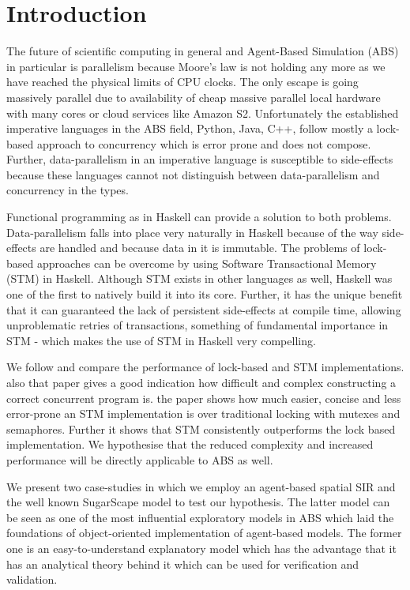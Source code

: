 \section{Introduction} %
The future of scientific computing in general and Agent-Based Simulation (ABS) in particular is parallelism because Moore's law is not holding any more as we have reached the physical limits of CPU clocks. The only escape is going massively parallel due to availability of cheap massive parallel local hardware with many cores or cloud services like Amazon S2. Unfortunately the established imperative languages in the ABS field, Python, Java, C++, follow mostly a lock-based approach to concurrency which is error prone and does not compose. Further, data-parallelism in an imperative language is susceptible to side-effects because these languages cannot not distinguish between data-parallelism and concurrency in the types. 

Functional programming as in Haskell can provide a solution to both problems. Data-parallelism falls into place very naturally in Haskell because of the way side-effects are handled and because data in it is immutable. The problems of lock-based approaches can be overcome by using Software Transactional Memory (STM) in Haskell. Although STM exists in other languages as well, Haskell was one of the first to natively build it into its core. Further, it has the unique benefit that it can guaranteed the lack of persistent side-effects at compile time, allowing unproblematic retries of transactions, something of fundamental importance in STM - which makes the use of STM in Haskell very compelling.

We follow \cite{discolo_lock_2006} and compare the performance of lock-based and STM implementations.  also that paper gives a good indication how difficult and complex constructing a correct concurrent program is. the paper shows how much easier, concise and less error-prone an STM implementation is over traditional locking with mutexes and semaphores. Further it shows that STM consistently outperforms the lock based implementation. We hypothesise that the reduced complexity and increased performance will be directly applicable to ABS as well.

We present two case-studies in which we employ an agent-based spatial SIR \citep{macal_agent-based_2010} and the well known SugarScape \citep{epstein_growing_1996} model to test our hypothesis. The latter model can be seen as one of the most influential exploratory models in ABS which laid the foundations of object-oriented implementation of agent-based models. The former one is an easy-to-understand explanatory model which has the advantage that it has an analytical theory behind it which can be used for verification and validation. 

